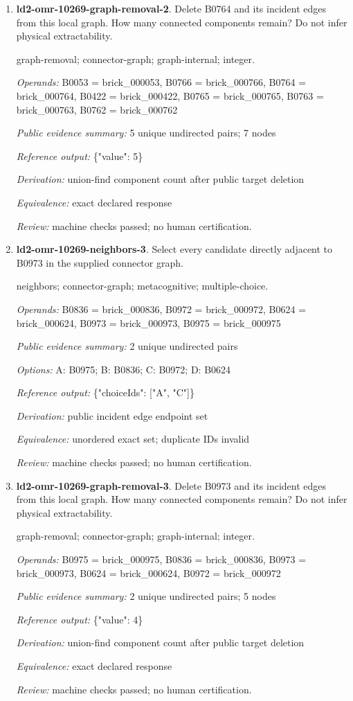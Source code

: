 \begin{enumerate}
\item \textbf{ld2-omr-10269-graph-removal-2}. Delete B0764 and its incident edges from this local graph. How many connected components remain? Do not infer physical extractability.
\par{\small graph-removal; connector-graph; graph-internal; integer.\par\textit{Operands:} B0053 = brick\_000053, B0766 = brick\_000766, B0764 = brick\_000764, B0422 = brick\_000422, B0765 = brick\_000765, B0763 = brick\_000763, B0762 = brick\_000762\par\textit{Public evidence summary:} 5 unique undirected pairs; 7 nodes\par\textit{Reference output:} \{"value": 5\}\par\textit{Derivation:} union-find component count after public target deletion\par\textit{Equivalence:} exact declared response\par\textit{Review:} machine checks passed; no human certification.}
\item \textbf{ld2-omr-10269-neighbors-3}. Select every candidate directly adjacent to B0973 in the supplied connector graph.
\par{\small neighbors; connector-graph; metacognitive; multiple-choice.\par\textit{Operands:} B0836 = brick\_000836, B0972 = brick\_000972, B0624 = brick\_000624, B0973 = brick\_000973, B0975 = brick\_000975\par\textit{Public evidence summary:} 2 unique undirected pairs\par\textit{Options:} A: B0975; B: B0836; C: B0972; D: B0624\par\textit{Reference output:} \{"choiceIds": ["A", "C"]\}\par\textit{Derivation:} public incident edge endpoint set\par\textit{Equivalence:} unordered exact set; duplicate IDs invalid\par\textit{Review:} machine checks passed; no human certification.}
\item \textbf{ld2-omr-10269-graph-removal-3}. Delete B0973 and its incident edges from this local graph. How many connected components remain? Do not infer physical extractability.
\par{\small graph-removal; connector-graph; graph-internal; integer.\par\textit{Operands:} B0975 = brick\_000975, B0836 = brick\_000836, B0973 = brick\_000973, B0624 = brick\_000624, B0972 = brick\_000972\par\textit{Public evidence summary:} 2 unique undirected pairs; 5 nodes\par\textit{Reference output:} \{"value": 4\}\par\textit{Derivation:} union-find component count after public target deletion\par\textit{Equivalence:} exact declared response\par\textit{Review:} machine checks passed; no human certification.}

\end{enumerate}
